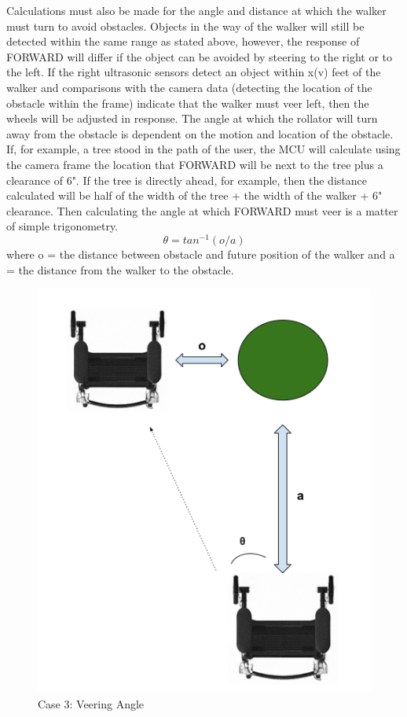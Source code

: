 \noindent Calculations must also be made for the angle and distance at which the walker must turn to avoid obstacles. Objects in the way of the walker will still be detected within the same range as stated above, however, the response of FORWARD will differ if the object can be avoided by steering to the right or to the left. If the right ultrasonic sensors detect an object within x(v) feet of the walker and comparisons with the camera data (detecting the location of the obstacle within the frame) indicate that the walker must veer left, then the wheels will be adjusted in response. The angle at which the rollator will turn away from the obstacle is dependent on the motion and location of the obstacle. If, for example, a tree stood in the path of the user, the MCU will calculate using the camera frame the location that FORWARD will be next to the tree plus a clearance of 6". If the tree is directly ahead, for example, then the distance calculated will be half of the width of the tree + the width of the walker + 6" clearance. Then calculating the angle at which FORWARD must veer is a matter of simple trigonometry.
\[ \theta = tan^{-1}(o/a)\]
\noindent where o = the distance between obstacle and future position of the walker and a = the distance from the walker to the obstacle.

\begin{figure}[H]
	\centering
	\includegraphics[width=.5\textwidth]{./Images/margin.png}
	\caption{\label{fig:margin}Case 3: Veering Angle}
\end{figure}

